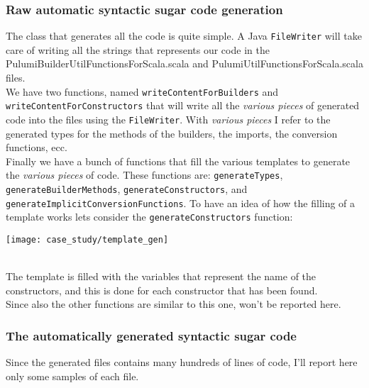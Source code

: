 \subsubsection{Raw automatic syntactic sugar code generation}
The class that generates all the code is quite simple.
A Java \texttt{FileWriter} will take care of writing all the strings that represents our code in the PulumiBuilderUtilFunctionsForScala.scala and PulumiUtilFunctionsForScala.scala files.\\
We have two functions, named \texttt{writeContentForBuilders} and \texttt{writeContentForConstructors} that will write all the \textit{various pieces} of generated code into the files using the \texttt{FileWriter}.
With \textit{various pieces} I refer to the generated types for the methods of the builders, the imports, the conversion functions, ecc.\\
Finally we have a bunch of functions that fill the various templates to generate the \textit{various pieces} of code.
These functions are: \texttt{generateTypes}, \texttt{generateBuilderMethods}, \texttt{generateConstructors}, and \texttt{generateImplicitConversionFunctions}.
To have an idea of how the filling of a template works lets consider the \texttt{generateConstructors} function:
\begin{center}
  \texttt{[image: case\_study/template\_gen]} 
\end{center}\mbox{}\\
The template is filled with the variables that represent the name of the constructors, and this is done for each constructor that has been found.\\
Since also the other functions are similar to this one, won't be reported here.

\subsubsection{The automatically generated syntactic sugar code}
Since the generated files contains many hundreds of lines of code, I'll report here only some samples of each file.\\

